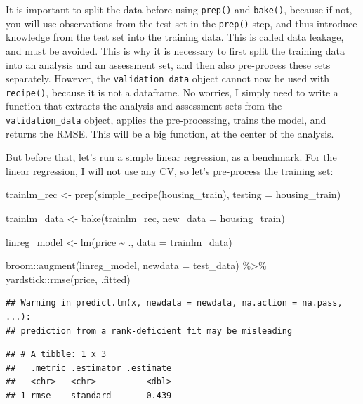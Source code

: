 \documentclass[
]{article}
\newenvironment{Shaded}{\begin{snugshade}}{\end{snugshade}}
\newcommand{\AttributeTok}[1]{\textcolor[rgb]{0.77,0.63,0.00}{#1}}
\newcommand{\FunctionTok}[1]{\textcolor[rgb]{0.00,0.00,0.00}{#1}}
\newcommand{\NormalTok}[1]{#1}
\newcommand{\OtherTok}[1]{\textcolor[rgb]{0.56,0.35,0.01}{#1}}
\newcommand{\SpecialCharTok}[1]{\textcolor[rgb]{0.00,0.00,0.00}{#1}}
\begin{document}
It is important to split the data before using \texttt{prep()} and \texttt{bake()}, because if not, you will
use observations from the test set in the \texttt{prep()} step, and thus introduce knowledge from the test
set into the training data. This is called data leakage, and must be avoided. This is why it is
necessary to first split the training data into an analysis and an assessment set, and then also
pre-process these sets separately. However, the \texttt{validation\_data} object cannot now be used with
\texttt{recipe()}, because it is not a dataframe. No worries, I simply need to write a function that extracts
the analysis and assessment sets from the \texttt{validation\_data} object, applies the pre-processing, trains
the model, and returns the RMSE. This will be a big function, at the center of the analysis.

But before that, let's run a simple linear regression, as a benchmark. For the linear regression, I will
not use any CV, so let's pre-process the training set:

\begin{Shaded}
\begin{Highlighting}[]
\NormalTok{trainlm\_rec }\OtherTok{\textless{}{-}} \FunctionTok{prep}\NormalTok{(}\FunctionTok{simple\_recipe}\NormalTok{(housing\_train), }\AttributeTok{testing =}\NormalTok{ housing\_train)}

\NormalTok{trainlm\_data }\OtherTok{\textless{}{-}} \FunctionTok{bake}\NormalTok{(trainlm\_rec, }\AttributeTok{new\_data =}\NormalTok{ housing\_train)}

\NormalTok{linreg\_model }\OtherTok{\textless{}{-}} \FunctionTok{lm}\NormalTok{(price }\SpecialCharTok{\textasciitilde{}}\NormalTok{ ., }\AttributeTok{data =}\NormalTok{ trainlm\_data)}

\NormalTok{broom}\SpecialCharTok{::}\FunctionTok{augment}\NormalTok{(linreg\_model, }\AttributeTok{newdata =}\NormalTok{ test\_data) }\SpecialCharTok{\%\textgreater{}\%} 
\NormalTok{    yardstick}\SpecialCharTok{::}\FunctionTok{rmse}\NormalTok{(price, .fitted)}
\end{Highlighting}
\end{Shaded}

\begin{verbatim}
## Warning in predict.lm(x, newdata = newdata, na.action = na.pass, ...):
## prediction from a rank-deficient fit may be misleading
\end{verbatim}

\begin{verbatim}
## # A tibble: 1 x 3
##   .metric .estimator .estimate
##   <chr>   <chr>          <dbl>
## 1 rmse    standard       0.439
\end{verbatim}
\end{document}
